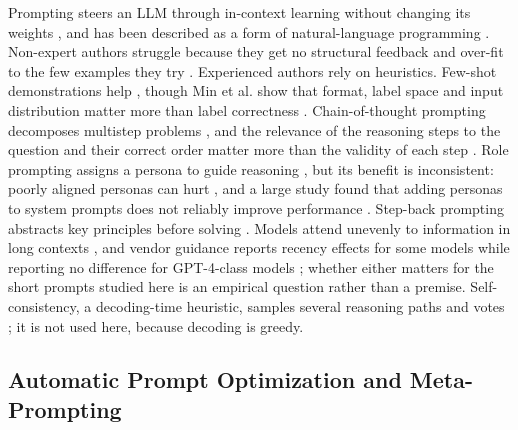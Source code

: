 \documentclass{ieeeaccess}
\begin{document}
Prompting steers an LLM through in-context learning without changing its weights \cite{liu2023,brown2020}, and has been described as a form of natural-language programming \cite{reynolds2021}. Non-expert authors struggle because they get no structural feedback and over-fit to the few examples they try \cite{zamfirescupereira2023}. Experienced authors rely on heuristics. Few-shot demonstrations help \cite{brown2020,dong2024}, though Min et al. show that format, label space and input distribution matter more than label correctness \cite{min2022}. Chain-of-thought prompting decomposes multistep problems \cite{wei2022,kojima2022}, and the relevance of the reasoning steps to the question and their correct order matter more than the validity of each step \cite{wang2023}. Role prompting assigns a persona to guide reasoning \cite{kong2024}, but its benefit is inconsistent: poorly aligned personas can hurt \cite{kim2024}, and a large study found that adding personas to system prompts does not reliably improve performance \cite{zheng2024b}. Step-back prompting abstracts key principles before solving \cite{zheng2024}. Models attend unevenly to information in long contexts \cite{liu2024,yu2025}, and vendor guidance reports recency effects for some models while reporting no difference for GPT-4-class models \cite{microsoft2025}; whether either matters for the short prompts studied here is an empirical question rather than a premise. Self-consistency, a decoding-time heuristic, samples several reasoning paths and votes \cite{wang2023b}; it is not used here, because decoding is greedy.

\subsection{Automatic Prompt Optimization and Meta-Prompting}
\end{document}
